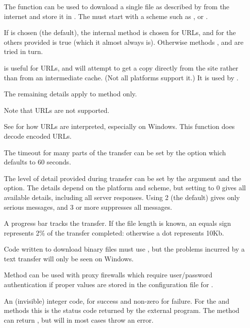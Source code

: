 \begin{Details}\relax
The function  can be used to download a single
file as described by  from the internet and store it in
.
The  must start with a scheme such as
,  or .

If  is chosen (the default), the internal method
is chosen for  URLs, and for the others provided
 is true (which it almost always
is).  Otherwise methods ,  and 
are tried in turn.

 is useful for  URLs, and will
attempt to get a copy directly from the site rather than from an
intermediate cache.  (Not all platforms support it.)
It is used by .

The remaining details apply to method  only.

Note that  URLs are
not supported.

See  for how  URLs are interpreted,
especially on Windows.  This function does decode encoded URLs.

The timeout for many parts of the transfer can be set by the option
 which defaults to 60 seconds.

The level of detail provided during transfer can be set by the
 argument and the  option.  The
details depend on the platform and scheme, but setting
 to 0 gives all available details, including
all server responses.  Using 2 (the default) gives only serious
messages, and 3 or more suppresses all messages.

A progress bar tracks the transfer.  If the file length is known, an
equals sign represents 2\% of the transfer completed: otherwise a dot
represents 10Kb.

Code written to download binary files must use , but
the problems incurred by a text transfer will only be seen on Windows.

Method  can be used with proxy firewalls which require
user/password authentication if proper values are stored in the
configuration file for .
\end{Details}
%
\begin{Value}
An (invisible) integer code,  for success and non-zero for
failure.  For the  and  methods this is the
status code returned by the external program.  The 
method can return , but will in most cases throw an error.
\end{Value}
